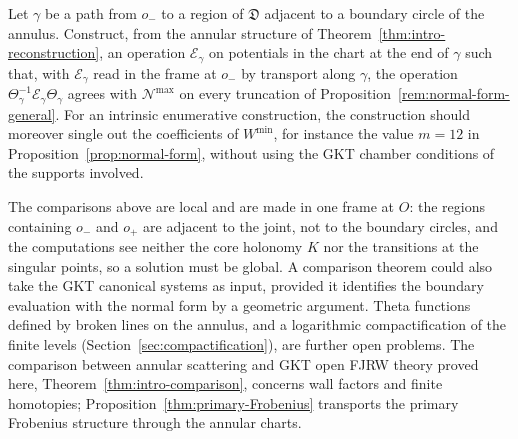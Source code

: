\begin{problem}\label{prob:endpoint}
Let $\gamma$ be a path from $o_-$ to a region of $\mathfrak D$ adjacent to a
boundary circle of the annulus.  Construct, from the annular structure of
Theorem~\ref{thm:intro-reconstruction}, an operation $\mathcal E_\gamma$ on
potentials in the chart at the end of $\gamma$ such that, with
$\mathcal E_\gamma$ read in the frame at $o_-$ by transport along $\gamma$,
the operation $\Theta_\gamma^{-1}\mathcal E_\gamma\Theta_\gamma$ agrees with
$\mathcal N^{\max}$ on every truncation of
Proposition~\ref{rem:normal-form-general}.  For an intrinsic enumerative
construction, the construction should moreover single out the coefficients
of $W^{\min}$, for instance the value $m=12$ in
Proposition~\ref{prop:normal-form}, without using the GKT chamber conditions
of the supports involved.
\end{problem}

The comparisons above are local and
are made in one frame at $O$: the regions containing $o_-$ and $o_+$ are
adjacent to the joint, not to the boundary circles, and the computations see
neither the core holonomy $K$ nor the transitions at the singular points, so
a solution must be global.  A comparison theorem could also take the GKT
canonical systems as input, provided it identifies the boundary evaluation
with the normal form by a geometric argument.  Theta functions defined by
broken lines on the annulus, and a logarithmic compactification of the
finite levels (Section~\ref{sec:compactification}), are further open
problems.  The comparison between annular scattering and GKT open FJRW
theory proved here, Theorem~\ref{thm:intro-comparison}, concerns wall
factors and finite homotopies; Proposition~\ref{thm:primary-Frobenius}
transports the primary Frobenius structure through the annular charts.
